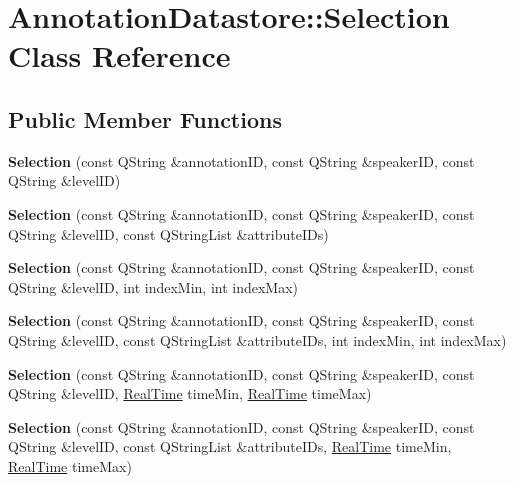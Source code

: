 \hypertarget{class_annotation_datastore_1_1_selection}{}\section{Annotation\+Datastore\+:\+:Selection Class Reference}
\label{class_annotation_datastore_1_1_selection}
\subsection*{Public Member Functions}
\begin{DoxyCompactItemize}
\item 
\mbox{\label{class_annotation_datastore_1_1_selection_a70e9483acf664b97c78533d2d0e2956f}} 
{\bfseries Selection} (const Q\+String \&annotation\+ID, const Q\+String \&speaker\+ID, const Q\+String \&level\+ID)
\item 
\mbox{\label{class_annotation_datastore_1_1_selection_a0f3f6bb719d5272fb8f05e0204bf7fd4}} 
{\bfseries Selection} (const Q\+String \&annotation\+ID, const Q\+String \&speaker\+ID, const Q\+String \&level\+ID, const Q\+String\+List \&attribute\+I\+Ds)
\item 
\mbox{\label{class_annotation_datastore_1_1_selection_a22e104a506b89bb64e691265aa39b6e9}} 
{\bfseries Selection} (const Q\+String \&annotation\+ID, const Q\+String \&speaker\+ID, const Q\+String \&level\+ID, int index\+Min, int index\+Max)
\item 
\mbox{\label{class_annotation_datastore_1_1_selection_ad39d7a5a04d981f1cac6f7123c0adf57}} 
{\bfseries Selection} (const Q\+String \&annotation\+ID, const Q\+String \&speaker\+ID, const Q\+String \&level\+ID, const Q\+String\+List \&attribute\+I\+Ds, int index\+Min, int index\+Max)
\item 
\mbox{\label{class_annotation_datastore_1_1_selection_ab7327f7622ce2460b3a0e3064bd40f6d}} 
{\bfseries Selection} (const Q\+String \&annotation\+ID, const Q\+String \&speaker\+ID, const Q\+String \&level\+ID, \hyperlink{struct_real_time}{Real\+Time} time\+Min, \hyperlink{struct_real_time}{Real\+Time} time\+Max)
\item 
\mbox{\label{class_annotation_datastore_1_1_selection_a67a7d72b7b820744b67687b0da6f2597}} 
{\bfseries Selection} (const Q\+String \&annotation\+ID, const Q\+String \&speaker\+ID, const Q\+String \&level\+ID, const Q\+String\+List \&attribute\+I\+Ds, \hyperlink{struct_real_time}{Real\+Time} time\+Min, \hyperlink{struct_real_time}{Real\+Time} time\+Max)
\end{DoxyCompactItemize}
